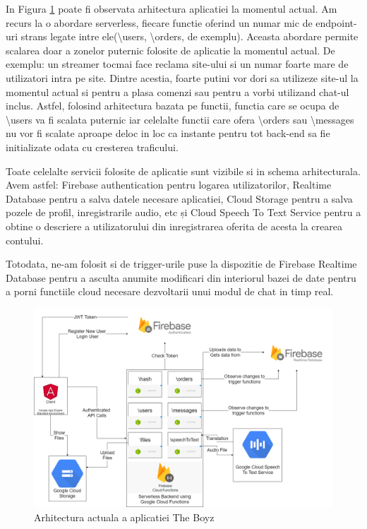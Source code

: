 \documentclass{article}
\begin{document}
In Figura \ref{fig:architecture} poate fi observata arhitectura aplicatiei la momentul actual. Am recurs la o abordare serverless, fiecare functie oferind un numar mic de endpoint-uri strans legate intre ele(\textbackslash users, \textbackslash orders, de exemplu). Aceasta abordare permite scalarea doar a zonelor puternic folosite de aplicatie la momentul actual. De exemplu: un streamer tocmai face reclama site-ului si un numar foarte mare de utilizatori intra pe site. Dintre acestia, foarte putini vor dori sa utilizeze site-ul la momentul actual si pentru a plasa comenzi sau pentru a vorbi utilizand chat-ul inclus. Astfel, folosind arhitectura bazata pe functii, functia care se ocupa de \textbackslash users va fi scalata puternic iar celelalte functii care ofera \textbackslash orders sau \textbackslash messages nu vor fi scalate aproape deloc in loc ca instante pentru tot back-end sa fie initializate odata cu cresterea traficului.

Toate celelalte servicii folosite de aplicatie sunt vizibile si in schema arhitecturala. Avem astfel: Firebase authentication pentru logarea utilizatorilor, Realtime Database pentru a salva datele necesare aplicatiei, Cloud Storage pentru a salva pozele de profil, inregistrarile audio, etc și Cloud Speech To Text Service pentru a obtine o descriere a utilizatorului din inregistrarea oferita de acesta la crearea contului. 

Totodata, ne-am folosit si de trigger-urile puse la dispozitie de Firebase Realtime Database pentru a asculta anumite modificari din interiorul bazei de date pentru a porni functiile cloud necesare dezvoltarii unui modul de chat in timp real.

\begin{figure}[ht]
\centering
\includegraphics[width=1\textwidth]{img/CC_architecture.png}
\caption{Arhitectura actuala a aplicatiei The Boyz} 
\label{fig:architecture}
\end{figure}
\end{document}
